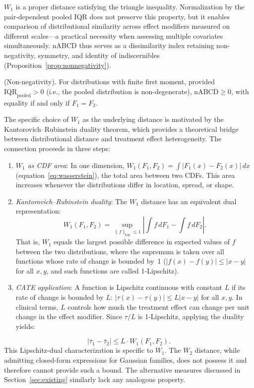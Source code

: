 \documentclass[AMA,Times1COL]{WileyNJDv5}
\begin{document}
$W_1$ is a proper distance satisfying the triangle inequality.\cite{villani2009} Normalization by the pair-dependent pooled IQR does not preserve this property, but it enables comparison of distributional similarity across effect modifiers measured on different scales---a practical necessity when assessing multiple covariates simultaneously. nABCD thus serves as a dissimilarity index retaining non-negativity, symmetry, and identity of indiscernibles (Proposition~\ref{prop:nonnegativity}).

\begin{proposition}\label{prop:nonnegativity}
\textup{(Non-negativity).} For distributions with finite first moment, provided $\mathrm{IQR}_{\mathrm{pooled}} > 0$ (i.e., the pooled distribution is non-degenerate), $\text{nABCD} \geq 0$, with equality if and only if $F_1 = F_2$.
\end{proposition}

The specific choice of $W_1$ as the underlying distance is motivated by the Kantorovich--Rubinstein duality theorem,\cite{villani2009} which provides a theoretical bridge between distributional distance and treatment effect heterogeneity. The connection proceeds in three steps:
\begin{enumerate}[1.]
\item \emph{$W_1$ as CDF area}: In one dimension, $W_1(F_1, F_2) = \int |F_1(x) - F_2(x)| \, dx$ (equation~\ref{eq:wasserstein}), the total area between two CDFs. This area increases whenever the distributions differ in location, spread, or shape.
\item \emph{Kantorovich--Rubinstein duality}: The $W_1$ distance has an equivalent dual representation:\cite{villani2009}
\[
W_1(F_1, F_2) = \sup_{\|f\|_{\text{Lip}} \leq 1} \left|\int f \, dF_1 - \int f \, dF_2\right|.
\]
That is, $W_1$ equals the largest possible difference in expected values of $f$ between the two distributions, where the supremum is taken over all functions whose rate of change is bounded by~1 ($|f(x) - f(y)| \leq |x - y|$ for all $x, y$, and such functions are called 1-Lipschitz).
\item \emph{CATE application}: A function is Lipschitz continuous with constant $L$ if its rate of change is bounded by $L$: $|\tau(x) - \tau(y)| \leq L|x - y|$ for all $x, y$. In clinical terms, $L$ controls how much the treatment effect can change per unit change in the effect modifier. Since $\tau/L$ is 1-Lipschitz, applying the duality yields:
\end{enumerate}
\begin{equation}
|\bar{\tau}_1 - \bar{\tau}_2| \leq L \cdot W_1(F_1, F_2).
\label{eq:heterogeneity_bound}
\end{equation}
This Lipschitz-dual characterization is specific to $W_1$. The $W_2$ distance, while admitting closed-form expressions for Gaussian families, does not possess it and therefore cannot provide such a bound. The alternative measures discussed in Section~\ref{sec:existing} similarly lack any analogous property.\cite{gibbs2002}
\end{document}

